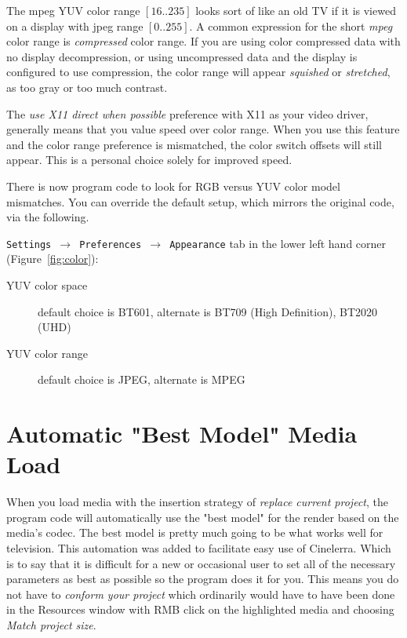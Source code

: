 The mpeg YUV color range $[16..235]$ looks sort of like an old TV if it is viewed on a display with jpeg range $[0..255]$.  A common expression for the short \textit{mpeg} color range is \textit{compressed} color range.  If you are using color compressed data with no display decompression, or using uncompressed data and the display is configured to use compression, the color range will appear \textit{squished} or \textit{stretched}, as too gray or too much contrast.

The \textit{use X11 direct when possible} preference with X11 as your video driver, generally means that you value speed over color range.  When you use this feature and the color range preference is mismatched, the color switch offsets will still appear.  This is a personal choice solely for improved speed.

There is now program code to look for RGB versus YUV color model mismatches.  You can override the default setup, which mirrors the original code, via the following.

\texttt{Settings $\rightarrow$ Preferences $\rightarrow$ Appearance} tab in the lower left hand corner (Figure~\ref{fig:color}):

\begin{description}
    \item[YUV color space] default choice is BT601, alternate is BT709 (High Definition), BT2020 (UHD)
    \item[YUV color range] default choice is JPEG,   alternate is MPEG
\end{description}

\section{Automatic "Best Model" Media Load}%
\label{sec:conform_the_project}
When you load media with the insertion strategy of \textit{replace current project}, the program code will
automatically use the "best model" for the render based on the media's codec.  The best model is pretty
much going to be what works well for television.  This automation was added to facilitate easy use of
Cinelerra.  Which is to say that it is difficult for a new or occasional user to set all of the 
necessary parameters as best as possible so the program does it for you.  This means you do not have to 
\textit{conform your project} which ordinarily would have to have been done in the Resources window with RMB
click on the highlighted media and choosing \textit{Match project size}. 

